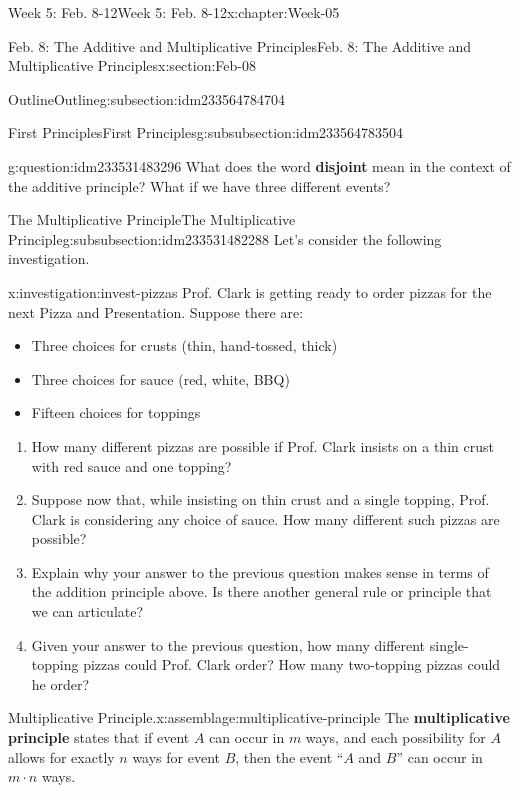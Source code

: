 \documentclass[oneside,10pt,]{book}
\newcommand{\terminology}[1]{\textbf{#1}}
\numberwithin{equation}{section}
\begin{document}
\begin{chapterptx}{Week 5: Feb. 8-12}{}{Week 5: Feb. 8-12}{}{}{x:chapter:Week-05}
\begin{sectionptx}{Feb. 8: The Additive and Multiplicative Principles}{}{Feb. 8: The Additive and Multiplicative Principles}{}{}{x:section:Feb-08}
\begin{subsectionptx}{Outline}{}{Outline}{}{}{g:subsection:idm233564784704}
\begin{subsubsectionptx}{First Principles}{}{First Principles}{}{}{g:subsubsection:idm233564783504}
\begin{question}{}{g:question:idm233531483296}
What does the word \terminology{disjoint} mean in the context of the additive principle? What if we have three different events?%
\end{question}
\end{subsubsectionptx}
%
%
\typeout{************************************************}
\typeout{************************************************}
%
\begin{subsubsectionptx}{The Multiplicative Principle}{}{The Multiplicative Principle}{}{}{g:subsubsection:idm233531482288}
Let's consider the following investigation.%
\begin{investigation}{}{x:investigation:invest-pizzas}%
Prof. Clark is getting ready to order pizzas for the next Pizza and Presentation. Suppose there are:%
%
\begin{itemize}[label=\textbullet]
\item{}Three choices for crusts (thin, hand-tossed, thick)%
\item{}Three choices for sauce (red, white, BBQ)%
\item{}Fifteen choices for toppings%
\end{itemize}
%
\begin{enumerate}
\item{}How many different pizzas are possible if Prof. Clark insists on a thin crust with red sauce and one topping?%
\item{}Suppose now that, while insisting on thin crust and a single topping, Prof. Clark is considering any choice of sauce. How many different such pizzas are possible?%
\item{}Explain why your answer to the previous question makes sense in terms of the addition principle above. Is there another general rule or principle that we can articulate?%
\item{}Given your answer to the previous question, how many different single-topping pizzas could Prof. Clark order? How many two-topping pizzas could he order?%
\end{enumerate}
\end{investigation}%
\begin{assemblage}{Multiplicative Principle.}{x:assemblage:multiplicative-principle}%
The \terminology{multiplicative principle} states that if event \(A\) can occur in \(m\) ways, and each possibility for \(A\) allows for exactly \(n\) ways for event \(B\), then the event ``\(A\) and \(B\)'' can occur in \(m \cdot n\) ways.%
\end{assemblage}

\end{subsubsectionptx}
\end{subsectionptx}
\end{sectionptx}
\end{chapterptx}
\end{document}
